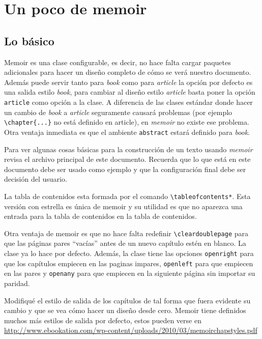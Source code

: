 
\chapter{Un poco de memoir}


\section{Lo básico}
Memoir es una clase configurable, es decir, no hace falta cargar paquetes
adicionales para hacer un diseño completo de cómo se verá nuestro documento.
Además puede servir tanto para \textit{book} como para \textit{article} la
opción por defecto es una salida estilo \textit{book}, para cambiar al
diseño estilo \textit{article} basta poner la opción \texttt{article} como
opción a la clase. A diferencia de las clases estándar donde hacer un cambio
de \textit{book} a \textit{article} seguramente causará problemas (por
ejemplo \verb|\chapter{...}| no está definido en article), en
\textit{memoir} no existe ese problema. Otra ventaja inmediata es que el
ambiente \texttt{abstract} estará definido para \textit{book}.

Para ver algunas cosas básicas para la construcción de un texto usando
\textit{memoir} revisa el archivo principal de este documento. Recuerda que
lo que está en este documento debe ser usado como ejemplo y que la
configuración final debe ser decisión del usuario.

La tabla de contenidos esta formada por el comando
\verb|\tableofcontents*|. Esta versión con estrella es única de memoir y su
utilidad es que no aparezca una entrada para la tabla de contenidos en la
tabla de contenidos.

Otra ventaja de memoir es que no hace falta redefinir
\verb|\cleardoublepage| para que las páginas pares ``vacías'' antes de un
nuevo capítulo estén en blanco. La clase ya lo hace por defecto. Además, la
clase tiene las opciones \texttt{openright} para que los capítulos empiecen
en las paginas impares, \texttt{openleft} para que empiecen en las pares y
\texttt{openany} para que empiecen en la siguiente página sin importar su
paridad.

Modifiqué el estilo de salida de los capítulos de tal forma que fuera
evidente su cambio y que se vea cómo hacer un diseño desde cero. Memoir tiene
definidos muchos más estilos de salida por defecto, estos pueden verse en
\url{http://www.ebookation.com/wp-content/uploads/2010/03/memoirchapstyles.pdf}

